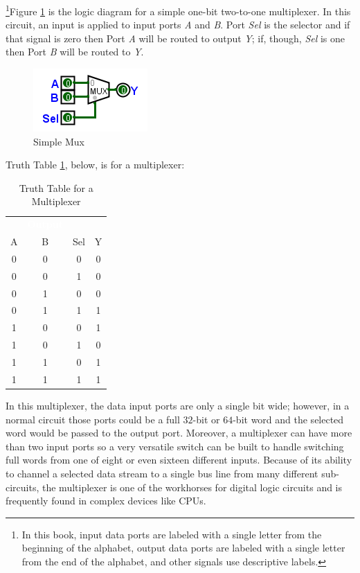 \footnote{In this book, input data ports are labeled with a single letter from the beginning of the alphabet, output data ports are labeled with a single letter from the end of the alphabet, and other signals use descriptive labels.}Figure \ref{fig:08_01} is the logic diagram for a simple one-bit two-to-one multiplexer. In this circuit, an input is applied to input ports \emph{A} and \emph{B}. Port \emph{Sel} is the selector and if that signal is zero then Port \emph{A} will be routed to output \emph{Y}; if, though, \emph{Sel} is one then Port \emph{B} will be routed to \emph{Y}.

\begin{figure}[H]
	\centering
	\includegraphics[width=\maxwidth{.95\linewidth}]{gfx/08_01}
	\caption{Simple Mux}
	\label{fig:08_01}
\end{figure}

Truth Table \ref{tab:08_01}, below, is for a multiplexer:

\begin{table}[H]
  \sffamily
  \newcommand{\head}[1]{\textcolor{white}{\textbf{#1}}}    
  \begin{center}
    \begin{tabular}{cc|cc} 
      \rowcolor{black!75}
      \multicolumn{3}{c}{\head{Inputs}} & \head{Output} \\
      A & B & Sel & Y \\
      \hline
      0 & 0 & 0 & 0 \\
      0 & 0 & 1 & 0 \\
      0 & 1 & 0 & 0 \\
      0 & 1 & 1 & 1 \\
      1 & 0 & 0 & 1 \\
      1 & 0 & 1 & 0 \\
      1 & 1 & 0 & 1 \\
      1 & 1 & 1 & 1 
    \end{tabular}
  \end{center}
  \caption{Truth Table for a Multiplexer}
  \label{tab:08_01}
\end{table}

In this multiplexer, the data input ports are only a single bit wide; however, in a normal circuit those ports could be a full $ 32 $-bit or $ 64 $-bit word and the selected word would be passed to the output port. Moreover, a multiplexer can have more than two input ports so a very versatile switch can be built to handle switching full words from one of eight or even sixteen different inputs. Because of its ability to channel a selected data stream to a single bus line from many different sub-circuits, the multiplexer is one of the workhorses for digital logic circuits and is frequently found in complex devices like \acp{CPU}.
 
